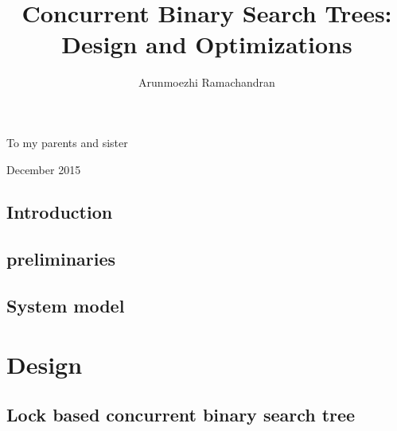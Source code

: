 \documentclass[doublespacing]{utdthesis}
\author{Arunmoezhi Ramachandran}
\title{Concurrent Binary Search Trees: \\ Design and Optimizations}
\newcommand{\preliminaries}{preliminaries}
\begin{document}
\frontmatter

\signaturepage
{} %

\begin{dedication} %
To my parents and sister
\end{dedication}

\maketitle

\begin{acks}{December 2015}

\end{acks}

\begin{preface} %
\prefacetext
\end{preface}

\begin{abstract}

\end{abstract}

\tableofcontents
\listoffigures %
\listoftables %

\mainmatter
\newenvironment{limitscope}{}{}

\chapter{Introduction}
\label{chapter:introduction}


\chapter{\preliminaries}
\label{chapter:\preliminaries}


\chapter{System model}
\label{chapter:systemModel}


\part{Design}

\chapter{Lock based concurrent binary search tree}
\label{chapter:castle}

\end{document}
